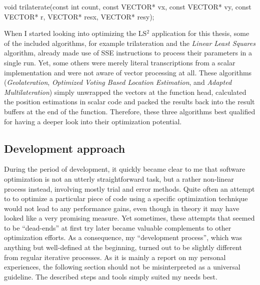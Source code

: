 \begin{code}[caption={Prototype of the \texttt{trilaterate} function},label=prototype]
void trilaterate(const int count, const VECTOR* vx, 
                 const VECTOR* vy, const VECTOR* r, 
                 VECTOR* resx, VECTOR* resy);
\end{code}

When I started looking into optimizing the LS$^{2}$ application for this thesis, some of the included algorithms, for example trilateration and the \emph{Linear Least Squares} algorithm, already made use of SSE instructions to process their parameters in a single run. Yet, some others were merely literal transcriptions from a scalar implementation and were not aware of vector processing at all. These algorithms (\emph{Geolateration}, \emph{Optimized Voting Based Location Estimation}, and \emph{Adapted Multilateration}) simply unwrapped the vectors at the function head, calculated the position estimations in scalar code and packed the results back into the result buffers at the end of the function. Therefore, these three algorithms best qualified for having a deeper look into their optimization potential.

\subsection{Development approach}
During the period of development, it quickly became clear to me that software optimization is not an utterly straightforward task, but a rather non-linear process instead, involving mostly trial and error methods. Quite often an attempt to to optimize a particular piece of code using a specific optimization technique would not lead to any performance gains, even though in theory it may have looked like a very promising measure. Yet sometimes, these attempts that seemed to be ``dead-ends'' at first try later became valuable complements to other optimization efforts. As a consequence, my ``development process'', which was anything but well-defined at the beginning, turned out to be slightly different from regular iterative processes. As it is mainly a report on my personal experiences, the following section should not be misinterpreted as a universal guideline. The described steps and tools simply suited my needs best.

